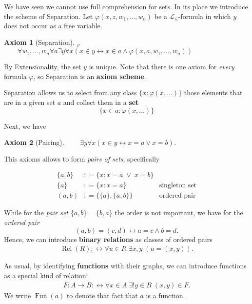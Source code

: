 \documentclass{article}
\newcommand{\Op}[1]{\operatorname{#1}}
\newtheorem{axiom}{Axiom}[section]
\begin{document}
We have seen we cannot use full comprehension for sets. In its place we introduce the scheme of Separation. Let $\varphi(x, z, w_1, \dots, w_n)$ be a $\mathcal{L}_\in$-formula in which $y$ does not occur as a free variable.

\begin{axiom}[Separation]\textbf{$_{{}\varphi}$}\\
$\qquad  \forall w_1, \dots, w_n \forall a \exists y \forall x (x \in y \leftrightarrow x \in a \wedge \varphi(x, a, w_1, \dots, w_n))$

\end{axiom}By Extensionality, the set $y$ is unique. Note that there is one axiom for \textit{every} formula ${}\varphi$, so Separation is an \textbf{axiom scheme}.

Separation allows us to select from any class $\{x \colon \varphi(x,\ldots)\}$ those elements that are in a given set $a$ and collect them in a \textbf{set}
\begin{equation*}
\{x \in a \colon \varphi(x,\ldots)\}
\end{equation*}

Next, we have

\begin{axiom}[Pairing]$\qquad \exists y \forall x( x \in y \leftrightarrow  x = a \vee x = b)$.

\end{axiom}This axioms allows to form \textit{pairs of sets}, specifically

\begin{align*}
    \{a,b\} & : =  \{x\colon x=a \; \vee \; x=b \} &    \\
    \{a\} &: = \{x\colon x=a  \} &    \text{singleton set}\\
    (a,b) &: =  \{\{a\},\{a,b\}\} &    \text{ordered pair}
\end{align*}

While for the \textit{pair set} $\{a,b\} = \{b,a\}$ the order is not important, we have for the \textit{ordered pair}
\begin{equation*}
(a,b) = (c,d) \leftrightarrow a = c \wedge b = d.
\end{equation*}
Hence, we can introduce \textbf{binary relations} as classes of ordered pairs
\begin{gather*}
    \Op{Rel}(R) :\leftrightarrow  \forall u \in R \; \exists x,y  \; (u =(x,y)).
\end{gather*}

As usual, by identifying \textbf{functions} with their graphs, we can introduce functions as a special kind of relation:
\begin{gather*}
F: A \to B :\leftrightarrow  \forall x \in A \; \exists ! y \in B \; (x,y) \in F.
\end{gather*}
We write $\Op{Fun}(a)$ to denote that fact that $a$ is a function.
\end{document}

